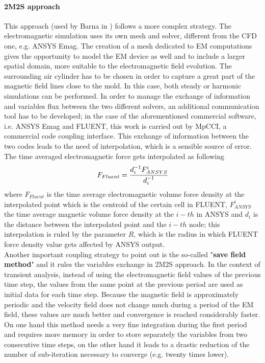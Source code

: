 \paragraph{2M2S approach}
This approach (used by Barna in \cite{Barna2009}) follows a more complex strategy. The electromagnetic simulation uses its own mesh and solver, different from the CFD one, e.g. ANSYS Emag. The creation of a mesh dedicated to EM computations gives the opportunity to model the EM device as well and to include a larger spatial domain, more suitable to the electromagnetic field evolution. The surrounding air cylinder has to be chosen in order to capture a great part of the magnetic field lines close to the mold. In this case, both steady or harmonic simulations can be performed. In order to manage the exchange of information and variables flux between the two different solvers, an additional communication tool has to be developed; in the case of the aforementioned commercial software, i.e. ANSYS Emag and FLUENT, this work is carried out by MpCCI, a commercial code coupling interface. This exchange of information between the two codes leads to the need of interpolation, which is a sensible source of error. The time averaged electromagnetic force gets interpolated as following\cite{2007}
\begin{equation}
F_{Fluent}=\cfrac{d_{i}^{-1}F_{ANSYS}^{i}}{d_{i}^{-1}}
\end{equation}
where $F_{Fluent}$ is the time average electromagnetic volume force density at the interpolated point which is the centroid of the certain cell in FLUENT, $F_{ANSYS}^{i}$ the time average magnetic volume force density at the $i-th$ in ANSYS and $d_i$ is the distance between the interpolated point and the $i-th$ node; this interpolation is ruled by the parameter $R$, which is the radius in which FLUENT force density value gets affected by ANSYS output.\\
Another important coupling strategy to point out is the so-called "\textbf{save field method}"\cite{Javurek2008} and it rules the variables exchange in 2M2S approach. In the context of transient analysis, instead of using the electromagnetic field values of the previous time step, the values from the same point at the previous period are used as initial data for each time step. Because the magnetic field is approximately periodic and the velocity field does not change much during a period of the EM field, these values are much better and convergence is reached considerably faster. On one hand this method needs a very fine integration during the first period and requires more memory in order to store separately the variables from two consecutive time steps, on the other hand it leads to a drastic reduction of the number of sub-iteration necessary to converge (e.g. twenty times lower).
